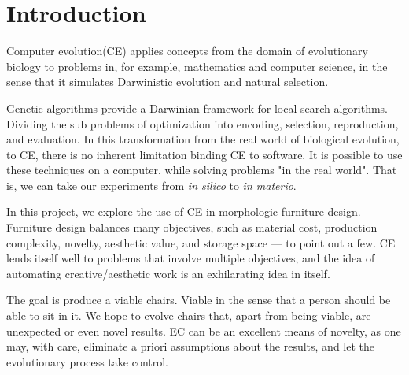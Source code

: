 \section{Introduction}
Computer evolution(CE) applies concepts from the domain of evolutionary
biology to problems in, for example, mathematics and computer science, in the
sense that it simulates Darwinistic evolution and natural selection.

Genetic algorithms provide a Darwinian framework for local search algorithms.
Dividing the sub problems of optimization into encoding, selection,
reproduction, and evaluation. In this transformation from the real world of
biological evolution, to CE, there is no inherent limitation binding CE to
software. It is possible to use these techniques on a computer, while solving
problems "in the real world". That is, we can take our experiments from
\emph{in silico} to \emph{in materio}\cite{paper:ev3}.

In this project, we explore the use of CE in morphologic furniture design.
Furniture design balances many objectives, such as material cost, production
complexity, novelty, aesthetic value, and storage space --- to point out a few.
CE lends itself well to problems that involve multiple objectives, and the idea
of automating creative/aesthetic work is an exhilarating idea in itself.

The goal is produce a viable chairs. Viable in the sense that a person should be
able to sit in it. We hope to evolve chairs that, apart from being viable,
are unexpected or even novel results. EC can be an excellent means of novelty,
as one may, with care, eliminate a priori assumptions about the results, and let
the evolutionary process take control.

